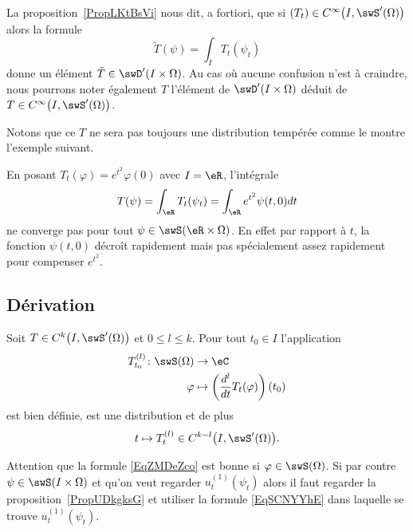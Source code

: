 \begin{remark}  \label{RemZYVkHRT}
	La proposition~\ref{PropLKtBsVi} nous dit, a fortiori, que si \( (T_t)\in C^{\infty}\big( I,\swS'(\Omega) \big)\) alors la formule
	\begin{equation}
		\tilde T(\psi)=\int_IT_t(\psi_t)
	\end{equation}
	donne un élément \( \tilde T\in\swD'(I\times \Omega)\). Au cas où aucune confusion n'est à craindre, nous pourrons noter également \( T\) l'élément de \( \swD'(I\times \Omega)\) déduit de \( T\in C^{\infty}\big( I,\swS'(\Omega) \big)\).
\end{remark}

Notons que ce \( T\) ne sera pas toujours une distribution tempérée comme le montre l'exemple suivant.

\begin{example}
	En posant \( T_t(\varphi)= e^{t^2}\varphi(0)\) avec \( I=\eR\), l'intégrale
	\begin{equation}
		T(\psi)=\int_{\eR}T_t(\psi_t)=\int_{\eR} e^{t^2}\psi(t,0)dt
	\end{equation}
	ne converge pas pour tout \( \psi\in\swS(\eR\times \Omega)\). En effet par rapport à \( t\), la fonction \( \psi(t,0)\) décroît rapidement mais pas spécialement assez rapidement pour compenser \( e^{t^2}\).
\end{example}

\subsection{Dérivation}

\begin{proposition} \label{PropGKoPbko}
	Soit \( T\in C^k\big( I,\swS'(\Omega) \big)\) et \( 0\leq l\leq k\). Pour tout \( t_0\in I\) l'application
	\begin{equation}    \label{EqZMDeZco}
		\begin{aligned}
			T_{t_0}^{(l)}\colon \swS(\Omega) & \to \eC                                                   \\
			\varphi                          & \mapsto \left(\frac{ d^l  }{ dt }T_t(\varphi)\right)(t_0)
		\end{aligned}
	\end{equation}
	est bien définie, est une distribution et de plus
	\begin{equation}
		t\mapsto T_t^{(l)}\in C^{k-l}\big( I,\swS'(\Omega) \big).
	\end{equation}
\end{proposition}
Attention que la formule \eqref{EqZMDeZco} est bonne si \( \varphi\in\swS(\Omega)\). Si par contre \( \psi\in\swS(I\times \Omega)\) et qu'on veut regarder \( u_t^{(1)}(\psi_t)\) alors il faut regarder la proposition~\ref{PropUDkgksG} et utiliser la formule \eqref{EqSCNYYhE} dans laquelle se trouve \( u_t^{(1)}(\psi_t)\).

